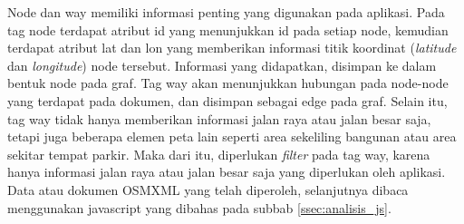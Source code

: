 Node dan way memiliki informasi penting yang digunakan pada aplikasi. Pada
tag node terdapat atribut id yang menunjukkan id pada setiap node, kemudian
terdapat atribut lat dan lon yang memberikan informasi titik koordinat
(\textit{latitude} dan \textit{longitude}) node tersebut. Informasi yang
didapatkan, disimpan ke dalam bentuk node pada graf. Tag way akan
menunjukkan hubungan pada node-node yang terdapat pada dokumen, dan disimpan
sebagai edge pada graf. Selain itu, tag way tidak hanya memberikan informasi 
jalan raya atau jalan besar saja, tetapi juga beberapa elemen peta
lain seperti area sekeliling bangunan atau area sekitar tempat parkir. Maka dari
itu, diperlukan \textit{filter} pada tag way, karena hanya informasi jalan raya
atau jalan besar saja yang diperlukan oleh aplikasi. Data atau dokumen OSMXML
yang telah diperoleh, selanjutnya dibaca menggunakan javascript yang dibahas
pada subbab \ref{ssec:analisis_js}.

